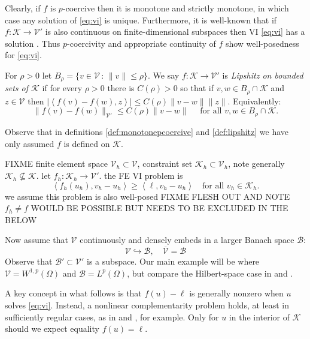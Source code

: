 \documentclass[hidelinks,onefignum,onetabnum,final]{siamart220329}  %
\newcommand{\cB}{\mathcal{B}}
\newcommand{\cK}{\mathcal{K}}
\newcommand{\cV}{\mathcal{V}}
\newcommand{\ip}[2]{\left<#1,#2\right>}
\begin{document}
Clearly, if $f$ is $p$-coercive then it is monotone and strictly monotone, in which case any solution of \eqref{eq:vi} is unique.  Furthermore, it is well-known that if $f:\cK \to \cV'$ is also continuous on finite-dimensional subspaces then VI \eqref{eq:vi} has a solution \cite[Corollary III.1.8]{KinderlehrerStampacchia1980}.  Thus $p$-coercivity and appropriate continuity of $f$ show well-posedness for \eqref{eq:vi}.


\begin{definition} \label{def:lipshitz}
For $\rho>0$ let $B_\rho = \{v\in \cV\,:\,\|v\|\le \rho\}$.  We say $f:\cK \to \cV'$ is \emph{Lipshitz on bounded sets of $\cK$} if for every $\rho>0$ there is $C(\rho)>0$ so that if $v,w \in B_\rho \cap \cK$ and $z\in\cV$ then $|\ip{f(v)-f(w)}{z}| \le C(\rho) \|v-w\| \|z\|$.  Equivalently:
\begin{equation}
\|f(v)-f(w)\|_{\cV'} \le C(\rho) \|v-w\| \quad \text{ for all } v,w \in B_\rho \cap \cK.  \label{eq:liponbounded}
\end{equation}
\end{definition}

Observe that in definitions \ref{def:monotonepcoercive} and \ref{def:lipshitz} we have only assumed $f$ is defined on $\cK$.

FIXME finite element space $\cV_h \subset \cV$, constraint set $\cK_h\subset \cV_h$, note generally $\cK_h \nsubseteq \cK$.  let $f_h:\cK_h\to\cV'$.  the FE VI problem is
\begin{equation}
\ip{f_h(u_h)}{v_h-u_h} \ge \ip{\ell}{v_h-u_h} \quad \text{for all } v_h\in \cK_h. \label{eq:fe:vi}
\end{equation}
we assume this problem is also well-posed FIXME FLESH OUT AND NOTE $f_h\ne f$ WOULD BE POSSIBLE BUT NEEDS TO BE EXCLUDED IN THE BELOW

Now assume that $\cV$ continuously and densely embeds in a larger Banach space $\cB$:
\begin{equation}
\cV \hookrightarrow \cB, \quad \overline{\cV} = \cB
\end{equation}
Observe that $\cB' \subset \cV'$ is a subspace.  Our main example will be where $\cV=W^{1,p}(\Omega)$ and $\cB=L^p(\Omega)$, but compare the Hilbert-space case in \cite{Falk1974} and \cite[section 5.1]{Ciarlet2002}.

A key concept in what follows is that $f(u)-\ell$ is generally nonzero when $u$ solves \eqref{eq:vi}.  Instead, a nonlinear complementarity problem holds, at least in sufficiently regular cases, as in \cite[Exercise 5.1.1]{Ciarlet2002}  and \cite[section 7]{BuelerFarrell2024}, for example.  Only for $u$ in the interior of $\cK$ should we expect equality $f(u)=\ell$.
\end{document}
